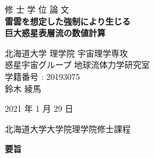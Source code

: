 \documentclass[a4j,12pt,openbib,oneside]{jreport}
\begin{document}
\begin{titlepage}
 \centering
 \vspace*{40truept}
 {\Huge 修 \hspace{10pt} 士 \hspace{10pt} 学 \hspace{10pt} 位
 \hspace{10pt} 論 \hspace{10pt} 文}\\  %
 \vspace*{50truept}
 \textbf{{\Huge 雷雲を想定した強制により生じる\\
巨大惑星表層流の数値計算}} \\ %
 \vspace{30truept}
 \vspace{150truept}
 \begin{center}
  {\Large 北海道大学 理学院 宇宙理学専攻}
  \vspace{10truept}\\
  {\Large 惑星宇宙グループ 地球流体力学研究室}
  \vspace{10truept}\\
  {\Large 学籍番号 : 20193075} 
  \vspace{30truept}\\
  {\LARGE 鈴木 綾馬}
  \vspace{10truept}
 \end{center}
 \begin{center}
  {\Large 2021 年 1 月 29 日}
 \end{center}
 \vspace{50truept}
 {\Large 北海道大学大学院理学院修士課程} \\
\end{titlepage}


\thispagestyle{empty}
\setcounter{page}{0}

%
\clearpage
\begin{center}
\large{\bf 要旨}
\end{center}
\thispagestyle{empty}

%
%
\clearpage
\thispagestyle{empty}
\setcounter{page}{0}
\setcounter{tocdepth}{3}
\tableofcontents 
\thispagestyle{empty}
\setcounter{page}{0}
\end{document}

